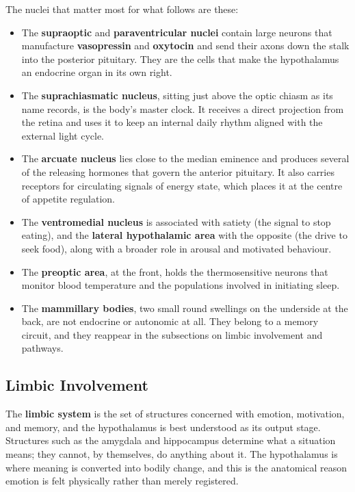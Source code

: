 \documentclass[11pt]{article}
\begin{document}
The nuclei that matter most for what follows are these:

\begin{itemize}
    \item The \textbf{supraoptic} and \textbf{paraventricular nuclei} contain large neurons that manufacture \textbf{vasopressin} and \textbf{oxytocin} and send their axons down the stalk into the posterior pituitary. They are the cells that make the hypothalamus an endocrine organ in its own right.
    \item The \textbf{suprachiasmatic nucleus}, sitting just above the optic chiasm as its name records, is the body's master clock. It receives a direct projection from the retina and uses it to keep an internal daily rhythm aligned with the external light cycle.
    \item The \textbf{arcuate nucleus} lies close to the median eminence and produces several of the releasing hormones that govern the anterior pituitary. It also carries receptors for circulating signals of energy state, which places it at the centre of appetite regulation.
    \item The \textbf{ventromedial nucleus} is associated with satiety (the signal to stop eating), and the \textbf{lateral hypothalamic area} with the opposite (the drive to seek food), along with a broader role in arousal and motivated behaviour.
    \item The \textbf{preoptic area}, at the front, holds the thermosensitive neurons that monitor blood temperature and the populations involved in initiating sleep.
    \item The \textbf{mammillary bodies}, two small round swellings on the underside at the back, are not endocrine or autonomic at all. They belong to a memory circuit, and they reappear in the subsections on limbic involvement and pathways.
\end{itemize}

\subsection{Limbic Involvement}

The \textbf{limbic system} is the set of structures concerned with emotion, motivation, and memory, and the hypothalamus is best understood as its output stage. Structures such as the amygdala and hippocampus determine what a situation means; they cannot, by themselves, do anything about it. The hypothalamus is where meaning is converted into bodily change, and this is the anatomical reason emotion is felt physically rather than merely registered.
\end{document}

